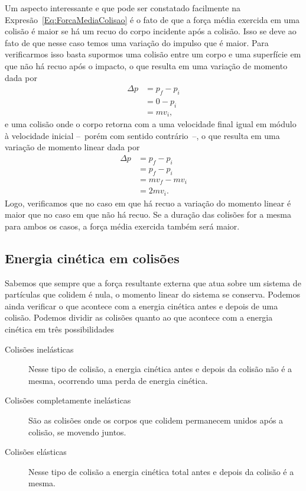 Um aspecto interessante e que pode ser constatado facilmente na Expresão~\ref{Eq:ForcaMediaColisao} é o fato de que a força média exercida em uma colisão é maior se há um recuo do corpo incidente após a colisão. Isso se deve ao fato de que nesse caso temos uma variação do impulso que é maior. Para verificarmos isso basta supormos uma colisão entre um corpo e uma superfície em que não há recuo após o impacto, o que resulta em uma variação de momento dada por
\begin{align}
    \Delta p &= p_f - p_i \\
    &= 0 - p_i \\
    &= m v_i,
\end{align}
%
e uma colisão onde o corpo retorna com a uma velocidade final igual em módulo à velocidade inicial --~porém com sentido contrário~--, o que resulta em uma variação de momento linear dada por
\begin{align}
    \Delta p &= p_f - p_i \\
    &= p_f - p_i \\
    &= mv_f - mv_i \\
    &= 2mv_i.
\end{align}
%
Logo, verificamos que no caso em que há recuo a variação do momento linear é maior que no caso em que não há recuo. Se a duração das colisões for a mesma para ambos os casos, a força média exercida também será maior.

\subsection{Energia cinética em colisões}

Sabemos que sempre que a força resultante externa que atua sobre um sistema de partículas que colidem é nula, o momento linear do sistema se conserva. Podemos ainda verificar o que acontece com a energia cinética antes e depois de uma colisão. Podemos dividir as colisões quanto ao que acontece com a energia cinética em três possibilidades
\begin{description}
  \item[Colisões inelásticas] Nesse tipo de colisão, a energia cinética antes e depois da colisão não é a mesma, ocorrendo uma perda de energia cinética.
  \item[Colisões completamente inelásticas] São as colisões onde os corpos que colidem permanecem unidos após a colisão, se movendo juntos. %
  \item[Colisões elásticas] Nesse tipo de colisão a energia cinética total antes e depois da colisão é a mesma.
\end{description}

